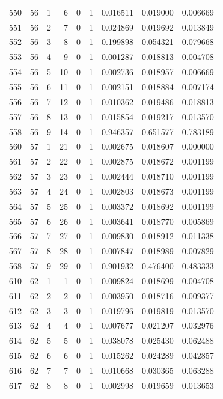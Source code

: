 \begin{longtable}{rrrrrrrrr}
550 & 56 & 1 & 6 & 0 & 1 & 0.016511 & 0.019000 & 0.006669 \\
551 & 56 & 2 & 7 & 0 & 1 & 0.024869 & 0.019692 & 0.013849 \\
552 & 56 & 3 & 8 & 0 & 1 & 0.199898 & 0.054321 & 0.079668 \\
553 & 56 & 4 & 9 & 0 & 1 & 0.001287 & 0.018813 & 0.004708 \\
554 & 56 & 5 & 10 & 0 & 1 & 0.002736 & 0.018957 & 0.006669 \\
555 & 56 & 6 & 11 & 0 & 1 & 0.002151 & 0.018884 & 0.007174 \\
556 & 56 & 7 & 12 & 0 & 1 & 0.010362 & 0.019486 & 0.018813 \\
557 & 56 & 8 & 13 & 0 & 1 & 0.015854 & 0.019217 & 0.013570 \\
558 & 56 & 9 & 14 & 0 & 1 & 0.946357 & 0.651577 & 0.783189 \\
560 & 57 & 1 & 21 & 0 & 1 & 0.002675 & 0.018607 & 0.000000 \\
561 & 57 & 2 & 22 & 0 & 1 & 0.002875 & 0.018672 & 0.001199 \\
562 & 57 & 3 & 23 & 0 & 1 & 0.002444 & 0.018710 & 0.001199 \\
563 & 57 & 4 & 24 & 0 & 1 & 0.002803 & 0.018673 & 0.001199 \\
564 & 57 & 5 & 25 & 0 & 1 & 0.003372 & 0.018692 & 0.001199 \\
565 & 57 & 6 & 26 & 0 & 1 & 0.003641 & 0.018770 & 0.005869 \\
566 & 57 & 7 & 27 & 0 & 1 & 0.009830 & 0.018912 & 0.011338 \\
567 & 57 & 8 & 28 & 0 & 1 & 0.007847 & 0.018989 & 0.007829 \\
568 & 57 & 9 & 29 & 0 & 1 & 0.901932 & 0.476400 & 0.483333 \\
610 & 62 & 1 & 1 & 0 & 1 & 0.009824 & 0.018699 & 0.004708 \\
611 & 62 & 2 & 2 & 0 & 1 & 0.003950 & 0.018716 & 0.009377 \\
612 & 62 & 3 & 3 & 0 & 1 & 0.019796 & 0.019819 & 0.013570 \\
613 & 62 & 4 & 4 & 0 & 1 & 0.007677 & 0.021207 & 0.032976 \\
614 & 62 & 5 & 5 & 0 & 1 & 0.038078 & 0.025430 & 0.062488 \\
615 & 62 & 6 & 6 & 0 & 1 & 0.015262 & 0.024289 & 0.042857 \\
616 & 62 & 7 & 7 & 0 & 1 & 0.010668 & 0.030365 & 0.063288 \\
617 & 62 & 8 & 8 & 0 & 1 & 0.002998 & 0.019659 & 0.013653 \\

\end{longtable}
